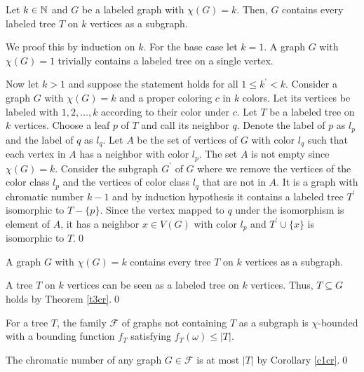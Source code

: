 \begin{thm}\label{t3cr}
Let $k\in\mathbb{N}$ and $G$ be a labeled graph with $\chi (G) = k$. Then, $G$ contains every labeled tree $T$ on $k$ vertices as a subgraph. 
\end{thm}
\begin{prf}
We proof this by induction on $k$. For the base case let $k=1$. A graph $G$ with $\chi (G)=1$ trivially contains a labeled tree on a single vertex.

Now let $k>1$ and suppose the statement holds for all $1\leq k^\prime <k$. Consider a graph $G$ with $\chi (G) = k$ and a proper coloring $c$ in $k$ colors. Let its vertices be labeled with $1, 2, \dots , k$ according to their color under $c$. Let $T$ be a labeled tree on $k$ vertices. Choose a leaf $p$ of $T$ and call its neighbor $q$. Denote the label of $p$ as $l_p$ and the label of $q$ as $l_q$. Let $A$ be the set of vertices of $G$ with color $l_q$ such that each vertex in $A$ has a neighbor with color $l_p$. The set $A$ is not empty since $\chi (G)=k$. Consider the subgraph $G^\prime$ of $G$ where we remove the vertices of the color class $l_p$ and the vertices of color class $l_q$ that are not in $A$. It is a graph with chromatic number $k-1$ and by induction hypothesis it contains a labeled tree $T^\prime$ isomorphic to $T-\lbrace p\rbrace$. Since the vertex mapped to $q$ under the isomorphism is element of $A$, it has a neighbor $x\in V(G)$ with color $l_p$ and $T^\prime\cup\lbrace x\rbrace$ is isomorphic to $T$.\qed
\end{prf}
\begin{cor}\label{c1cr}
A graph $G$ with $\chi (G) = k$ contains every tree $T$ on $k$ vertices as a subgraph. 
\end{cor}
\begin{prf}
A tree $T$ on $k$ vertices can be seen as a labeled tree on $k$ vertices. Thus, $T\subseteq G$ holds by Theorem \ref{t3cr}.\qed
\end{prf}

\begin{cor}
For a tree $T$, the family $\mathcal{F}$ of graphs not containing $T$ as a subgraph is $\chi$-bounded with a bounding function $f_T$ satisfying $f_T(\omega )\leq\vert T\vert$.
\end{cor}
\begin{prf}
The chromatic number of any graph $G\in\mathcal{F}$ is at most $\vert T\vert$ by Corollary \ref{c1cr}.\qed
\end{prf}

